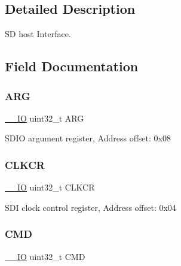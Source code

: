 \subsection{Detailed Description}
SD host Interface. 

\subsection{Field Documentation}
\mbox{\label{struct_s_d_i_o___type_def_a07d4e63efcbde252c667e64a8d818aa9}} 
\subsubsection{\texorpdfstring{A\+RG}{ARG}}
{\footnotesize\ttfamily \mbox{\hyperlink{core__sc300_8h_aec43007d9998a0a0e01faede4133d6be}{\+\_\+\+\_\+\+IO}} uint32\+\_\+t A\+RG}

S\+D\+IO argument register, Address offset\+: 0x08 \mbox{\label{struct_s_d_i_o___type_def_aa94197378e20fc739d269be49d9c5d40}} 
\subsubsection{\texorpdfstring{C\+L\+K\+CR}{CLKCR}}
{\footnotesize\ttfamily \mbox{\hyperlink{core__sc300_8h_aec43007d9998a0a0e01faede4133d6be}{\+\_\+\+\_\+\+IO}} uint32\+\_\+t C\+L\+K\+CR}

S\+DI clock control register, Address offset\+: 0x04 \mbox{\label{struct_s_d_i_o___type_def_adcf812cbe5147d300507d59d4a55935d}} 
\subsubsection{\texorpdfstring{C\+MD}{CMD}}
{\footnotesize\ttfamily \mbox{\hyperlink{core__sc300_8h_aec43007d9998a0a0e01faede4133d6be}{\+\_\+\+\_\+\+IO}} uint32\+\_\+t C\+MD}

